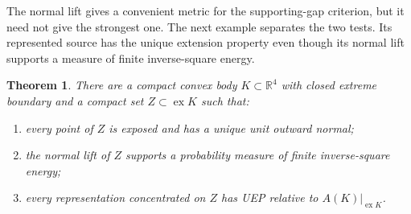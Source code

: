 \documentclass[11pt,letterpaper]{amsart}
\newtheorem{theorem}{Theorem}[section]
\theoremstyle{definition}
\theoremstyle{remark}
\numberwithin{equation}{section}
\DeclareMathOperator{\ex}{ex}
\newcommand{\R}{\mathbb R}
\begin{document}
The normal lift gives a convenient metric for the supporting-gap
criterion, but it need not give the strongest one. The next example
separates the two tests. Its represented source has the unique extension
property even though its normal lift supports a measure of finite
inverse-square energy.

\begin{theorem}\label{geom:thm}
There are a compact convex body $K\subset\R^4$ with closed extreme
boundary and a compact set $Z\subset\ex K$ such that:
\begin{enumerate}
\item every point of $Z$ is exposed and has a unique unit outward normal;
\item the normal lift of $Z$ supports a probability measure of finite
inverse-square energy;
\item every representation concentrated on $Z$ has UEP relative to $A(K)|_{\ex K}$.
\end{enumerate}
\end{theorem}
\end{document}
